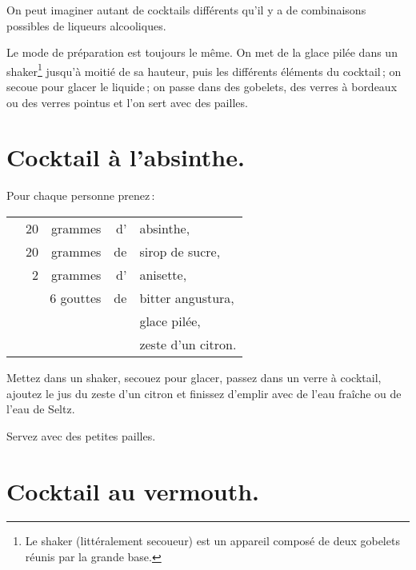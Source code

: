 On peut imaginer autant de cocktails différents qu'il y a de combinaisons
possibles de liqueurs alcooliques.

Le mode de préparation est toujours le même. On met de la glace pilée dans un
shaker\footnote{Le shaker (littéralement secoueur) est un appareil composé de
deux gobelets réunis par la grande base.} jusqu'à moitié de sa hauteur, puis
les différents éléments du cocktail ; on secoue pour glacer le liquide ; on
passe dans des gobelets, des verres à bordeaux ou des verres pointus et l'on
sert avec des pailles.

\section*{\centering Cocktail à l’absinthe.}
{}

Pour chaque personne prenez :

\footnotesize
\begin{longtable}{rrrrp{16em}}
  & 20 & grammes & d' & absinthe,                                                                         \\
  & 20 & grammes & de & sirop de sucre,                                                                   \\
  &  2 & grammes & d' & anisette,                                                                         \\
  & \multicolumn{2}{r}{6 gouttes} & de & bitter angustura,                                                \\
  &    &         &    & glace pilée,                                                                      \\
  &    &         &    & zeste d'un citron.                                                                \\
\end{longtable}
\normalsize

Mettez dans un shaker, secouez pour glacer, passez dans un verre à cocktail,
ajoutez le jus du zeste d'un citron et finissez d'emplir avec de l'eau fraîche
ou de l'eau de Seltz.

Servez avec des petites pailles.

\section*{\centering Cocktail au vermouth.}
{}

